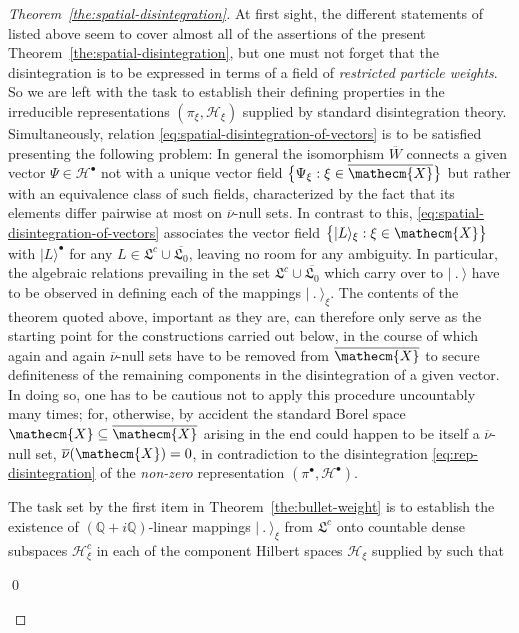 \documentclass[a4paper,a4paper]{article}
\numberwithin{equation}{section}
\newcommand{\Qbb}{\mathbb{Q}}
\newcommand{\Xecm}{\mathecm{X}}
\newcommand{\Hscr}{\mathscr{H}}
\newcommand{\Xecmbar}{\overline{\mathecm{X}}}
\newcommand{\Wbar}{\overline{W}}
\newcommand{\nubar}{\overline{\nu}}
\newcommand{\idealcount}{\mathfrak{L}^c}
\newcommand{\vacbar}{\overline{\mathfrak{L}_0}}
\newcommand{\Hbullet}{\mathscr{H}^\bullet}
\newcounter{proofitem}
\newenvironment{prooflist}{\begin{list}{(\roman{proofitem})}%
  {\usecounter{proofitem} \setlength{\topsep}{0ex}%
   \setlength{\parsep}{0.2ex} \setlength{\itemsep}{0.4ex}%
   \setlength{\leftmargin}{0em} \setlength{\itemindent}{0.5em}%
   \setlength{\listparindent}{1em}}}{\qed \end{list}}
\theoremstyle{definition}
\theoremstyle{plain}
\theoremstyle{remark}
\theoremstyle{assumption}
\newcommand{\bset}[1]{\bigl\{ #1 \bigr\}}
\newcommand{\ket}[1]{\vert #1 \rangle}
\newcommand{\bullket}[1]{\vert #1 \rangle^\bullet}
\newcommand{\xiket}[1]{\vert #1 \rangle_\xi}
\begin{document}
\begin{proof}[Theorem~\ref{the:spatial-disintegration}]
    At first sight, the different statements of
    \cite[Theorem~8.5.2]{dixmier:1982} listed above seem to cover
    almost all of the assertions of the present
    Theorem~\ref{the:spatial-disintegration}, but one must not forget
    that the disintegration is to be expressed in terms of a field of
    \emph{restricted particle weights}. So we are left with the task
    to establish their defining properties in the irreducible
    representations $( \pi_\xi , \Hscr_\xi )$ supplied by standard
    disintegration theory. Simultaneously, relation
    \eqref{eq:spatial-disintegration-of-vectors} is to be satisfied
    presenting the following problem: In general the isomorphism
    $\Wbar$ connects a given vector $\Psi \in \Hbullet$ not with a
    unique vector field $\bset{\Psi_\xi : \xi \in \Xecmbar}$ but
    rather with an equivalence class of such fields, characterized by
    the fact that its elements differ pairwise at most on
    $\nubar$-null sets. In contrast to this,
    \eqref{eq:spatial-disintegration-of-vectors} associates the vector
    field $\bset{\xiket{L} : \xi \in \Xecm}$ with $\bullket{L}$ for
    any $L \in \idealcount \cup \vacbar$, leaving no room for any
    ambiguity. In particular, the algebraic relations prevailing in
    the set $\idealcount \cup \vacbar$ which carry over to $\ket{~.~}$
    have to be observed in defining each of the mappings
    $\xiket{~.~}$. The contents of the theorem quoted above, important
    as they are, can therefore only serve as the starting point for
    the constructions carried out below, in the course of which again
    and again $\nubar$-null sets have to be removed from $\Xecmbar$ to
    secure definiteness of the remaining components in the
    disintegration of a given vector. In doing so, one has to be
    cautious not to apply this procedure uncountably many times; for,
    otherwise, by accident the standard Borel space $\Xecm \subseteq
    \Xecmbar$ arising in the end could happen to be itself a
    $\nubar$-null set, $\nubar ( \Xecm ) = 0$, in contradiction to the
    disintegration \eqref{eq:rep-disintegration} of the
    \emph{non-zero} representation $( \pi^\bullet , \Hbullet )$.
    \begin{prooflist}
    \item The task set by the first item in
      Theorem~\ref{the:bullet-weight} is to establish the existence of
      $(\Qbb + i \Qbb)$-linear mappings $\xiket{~.~}$ from
      $\idealcount$ onto countable dense subspaces $\Hscr_\xi^c$ in
      each of the component Hilbert spaces $\Hscr_\xi$ supplied by
      \cite[Theorem~8.5.2]{dixmier:1982} such that

\end{prooflist}
\end{proof}
\end{document}
